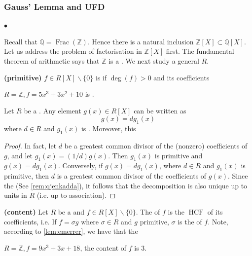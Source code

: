 \documentclass{article}
\newcommand{\bfs}[1]{\textbf{({#1}) }}
\newcommand{\HCF}{\operatorname{HCF}}
\begin{document}
\subsubsection{Gauss’ Lemma and UFD}

$\bullet$ 

Recall that $\mathbb{Q}=\operatorname{Frac}(\mathbb{Z})$. Hence there is a natural inclusion $\mathbb{Z}[X] \subset \mathbb{Q}[X]$. Let us address the problem of factorisation in $\mathbb{Z}[X]$ first. The fundamental theorem of arithmetic says that $\mathbb{Z}$ is a . We next study a general  $R$.

\begin{defa}\bfs{primitive}
$f \in R[X] \backslash\{0\}$ is  if $\operatorname{deg}(f)>0$ and its coefficients 
\end{defa}
\begin{exma}
$R=\mathbb{Z}, f=5 x^{3}+3 x^{2}+10$ is .
\end{exma}
\begin{lema}\label{lem:emerrer}
Let $R$ be a . Any element $g(x) \in R[X]$ can be written as
$$
g(x)=d g_{1}(x)
$$
where $d \in R$ and $g_{1}(x)$ is . Moreover, this 
\end{lema}
\begin{proof}
In fact, let $d$ be a greatest common divisor of the (nonzero) coefficients of $g$, and let $g_{1}(x)=(1 / d) g(x)$. Then $g_{1}(x)$ is primitive and $g(x)=d g_{1}(x)$. Conversely, if $g(x)=d g_{1}(x)$, where $d \in R$ and $g_{1}(x)$ is primitive, then $d$ is a greatest common divisor of the coefficients of $g(x)$. Since the  (See \cref{rem:qjenkadda}), it follows that the decomposition is also unique up to units in $R$ (i.e. up to association).
\end{proof}
\begin{defa}\bfs{content}
Let $R$ be a  and $f \in R[X] \backslash\{0\}$. The  of $f$ is the $\HCF$ of its coefficients, i.e. If $f=\sigma g$ where $\sigma \in R$ and $g$ primitive, $\sigma$ is the  of $f$. Note, according to \cref{lem:emerrer}, we have that the 
\end{defa}
\begin{exma}
$R=\mathbb{Z}, f=9 x^{3}+3 x+18$, the content of $f$ is 3.
\end{exma}
\end{document}
